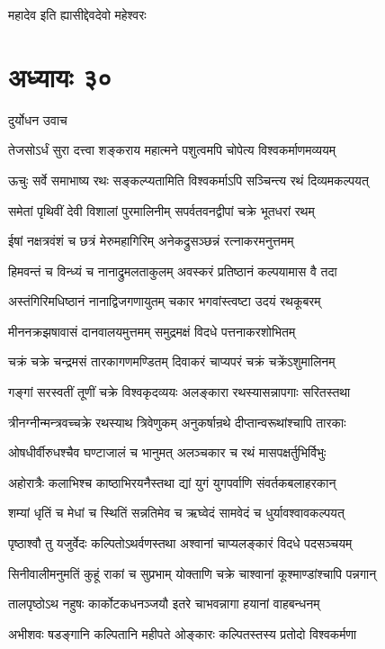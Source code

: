महादेव इति ह्यासीद्देवदेवो महेश्वरः
\chapter{अध्यायः ३०}
\twolineshloka
{दुर्योधन उवाच}
{}


\twolineshloka
{तेजसोऽर्धं सुरा दत्त्वा शङ्कराय महात्मने}
{पशुत्वमपि चोपेत्य विश्वकर्माणमव्ययम्}


\twolineshloka
{ऊचुः सर्वे समाभाष्य रथः सङ्कल्प्यतामिति}
{विश्वकर्माऽपि सञ्चिन्त्य रथं दिव्यमकल्पयत्}


\twolineshloka
{समेतां पृथिवीं देवी विशालां पुरमालिनीम्}
{सपर्वतवनद्वीपां चक्रे भूतधरां रथम्}


\twolineshloka
{ईषां नक्षत्रवंशं च छत्रं मेरुमहागिरिम्}
{अनेकद्रुसञ्छन्नं रत्नाकरमनुत्तमम्}


\twolineshloka
{हिमवन्तं च विन्ध्यं च नानाद्रुमलताकुलम्}
{अवस्करं प्रतिष्ठानं कल्पयामास वै तदा}


\twolineshloka
{अस्तंगिरिमधिष्ठानं नानाद्विजगणायुतम्}
{चकार भगवांस्त्वष्टा उदयं रथकूबरम्}


\twolineshloka
{मीननक्रझषावासं दानवालयमुत्तमम्}
{समुद्रमक्षं विदधे पत्तनाकरशोभितम्}


\twolineshloka
{चक्रं चक्रे चन्द्रमसं तारकागणमण्डितम्}
{दिवाकरं चाप्यपरं चक्रं चक्रेंऽशुमालिनम्}


\twolineshloka
{गङ्गां सरस्वतीं तूणीं चक्रे विश्वकृदव्ययः}
{अलङ्कारा रथस्यासन्नापगाः सरितस्तथा}


\twolineshloka
{त्रीनग्नीन्मन्त्रवच्चक्रे रथस्याथ त्रिवेणुकम्}
{अनुकर्षान्रथे दीप्तान्वरूथांश्चापि तारकाः}


\twolineshloka
{ओषधीर्वीरुधश्चैव घण्टाजालं च भानुमत्}
{अलञ्चकार च रथं मासपक्षर्तुभिर्विभुः}


\twolineshloka
{अहोरात्रैः कलाभिश्च काष्ठाभिरयनैस्तथा}
{द्यां युगं युगपर्वाणि संवर्तकबलाहरकान्}


\twolineshloka
{शम्यां धृतिं च मेधां च स्थितिं सन्नतिमेव च}
{ऋघ्वेदं सामवेदं च धुर्यावश्वावकल्पयत्}


\twolineshloka
{पृष्ठाश्वौ तु यजुर्वेदः कल्पितोऽथर्वणस्तथा}
{अश्वानां चाप्यलङ्कारं विदधे पदसञ्चयम्}


\threelineshloka
{सिनीवालीमनुमतिं कुहूं राकां च सुप्रभाम्}
{योक्ताणि चक्रे चाश्वानां कूश्माण्डांश्चापि पन्नगान्}
{}


\twolineshloka
{तालपृष्ठोऽथ नहुषः कार्कोटकधनञ्जयौ}
{इतरे चाभवन्नागा हयानां वाहबन्धनम्}


\twolineshloka
{अभीशवः षडङ्गानि कल्पितानि महीपते}
{ओङ्कारः कल्पितस्तस्य प्रतोदो विश्वकर्मणा}


